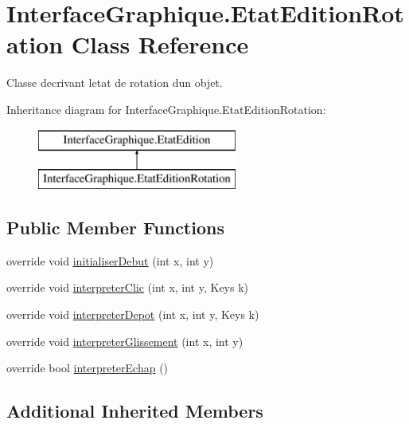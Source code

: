 \hypertarget{class_interface_graphique_1_1_etat_edition_rotation}{}\section{Interface\+Graphique.\+Etat\+Edition\+Rotation Class Reference}
\label{class_interface_graphique_1_1_etat_edition_rotation}


Classe decrivant l\textquotesingle{}etat de rotation d\textquotesingle{}un objet.  


Inheritance diagram for Interface\+Graphique.\+Etat\+Edition\+Rotation\+:\begin{figure}[H]
\begin{center}
\leavevmode
\includegraphics[height=2.000000cm]{class_interface_graphique_1_1_etat_edition_rotation}
\end{center}
\end{figure}
\subsection*{Public Member Functions}
\begin{DoxyCompactItemize}
\item 
override void \hyperlink{group__inf2990_ga6a6051304cdd5153ff8068c24ef1b6a8}{initialiser\+Debut} (int x, int y)
\item 
override void \hyperlink{group__inf2990_gad8114645cabee8c5134dbb26ec1e9705}{interpreter\+Clic} (int x, int y, Keys k)
\item 
override void \hyperlink{group__inf2990_gac99c3de472604def3a32384c864a5d63}{interpreter\+Depot} (int x, int y, Keys k)
\item 
override void \hyperlink{group__inf2990_gace97575f8172e5d90b07a1700e42211d}{interpreter\+Glissement} (int x, int y)
\item 
override bool \hyperlink{group__inf2990_ga17479ee6919b1656731c6fec910b6ce9}{interpreter\+Echap} ()
\end{DoxyCompactItemize}
\subsection*{Additional Inherited Members}


